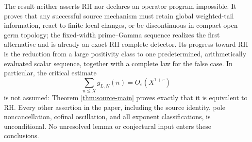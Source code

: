 \documentclass[11pt]{article}
\begin{document}
The result neither asserts RH nor declares an operator program impossible.  It proves that any
successful source mechanism must retain global weighted-tail information, react to finite local
changes, or be discontinuous in compact-open germ topology; the fixed-width prime--Gamma
sequence realizes the first alternative and is already an exact RH-complete detector.  Its
progress toward RH is the reduction from a large positivity class to one predetermined,
arithmetically evaluated scalar sequence, together with a complete law for the false case.  In
particular, the
critical estimate
\[
 \sum_{n\le X}g^-_{L,N}(n)=O_\varepsilon(X^{1+\varepsilon})
\]
is not assumed: Theorem \ref{thm:source-main} proves exactly that it is equivalent to RH.  Every
other assertion in the paper, including the source identity, pole noncancellation, cofinal
oscillation, and all exponent classifications, is unconditional.  No unresolved lemma or
conjectural input enters these conclusions.
\end{document}
